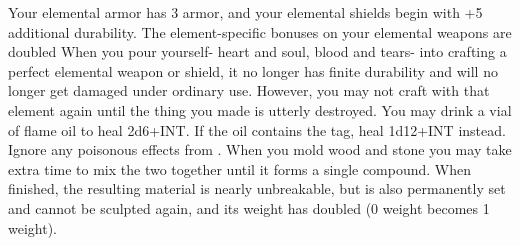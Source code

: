 \documentclass[]{dw_playbook}
\begin{document}
    {
            {Your elemental armor has 3 armor, and your elemental shields begin with +5 additional durability.}
        \gap
            {The element-specific bonuses on your elemental weapons are doubled}
        \gap
            {When you pour yourself- heart and soul, blood and tears- into crafting a perfect elemental weapon or shield, it no longer has finite durability and will no longer get damaged under ordinary use.  However, you may not craft with that element again until the thing you made is utterly destroyed.}
            {
            You may drink a vial of flame oil to heal 2d6+INT.  If the oil contains the  tag, heal 1d12+INT instead.  Ignore any poisonous effects from .}
        \gap
            {
            When you mold wood and stone you may take extra time to mix the two together until it forms a single compound.  When finished, the resulting material is nearly unbreakable, but is also permanently set and cannot be sculpted again, and its weight has doubled (0 weight becomes 1 weight).}
    }

\clearpage
~
\end{document}
